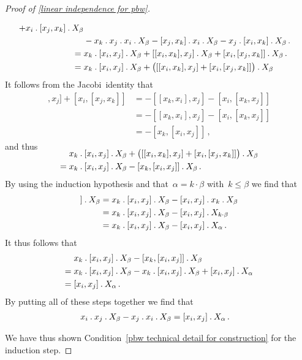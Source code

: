 \begin{proof}[Proof of \cref{linear independence for pbw}]
\begin{description}
\begin{align*}
        + x_i \mathbin{.} [x_j, x_k] \mathbin{.} X_\beta
        \\
        {}&
        - x_k \mathbin{.} x_j \mathbin{.} x_i \mathbin{.} X_\beta
        - [x_j, x_k] \mathbin{.} x_i \mathbin{.} X_\beta
        - x_j \mathbin{.} [x_i, x_k] \mathbin{.} X_\beta \,.
        \\
        ={}&
        x_k \mathbin{.} [x_i, x_j] \mathbin{.} X_\beta
        + [[x_i, x_k], x_j] \mathbin{.} X_\beta
        + [x_i, [x_j, x_k]] \mathbin{.} X_\beta \,.
        \\
        ={}&
        x_k \mathbin{.} [x_i, x_j] \mathbin{.} X_\beta
        + \bigl( [[x_i, x_k], x_j] + [x_i, [x_j, x_k]] \bigr) \mathbin{.} X_\beta
      \end{align*}
      It follows from the Jacobi~identity that
      \begin{align*}
        [[x_i, x_k], x_j] + [x_i, [x_j, x_k]]
        &=
        - [[x_k, x_i], x_j] - [x_i, [x_k, x_j]]
        \\
        &=
        - [[x_k, x_i], x_j] - [x_i, [x_k, x_j]]
        \\
        &=
        - [x_k, [x_i, x_j]] \,,
      \end{align*}
      and thus
      \begin{align*}
        \SwapAboveDisplaySkip
        {}&
        x_k \act [x_i, x_j] \act X_\beta
        + \bigl( [[x_i, x_k], x_j] + [x_i, [x_j, x_k]] \bigr) \act X_\beta
        \\
        ={}&
        x_k \act [x_i, x_j] \act X_\beta
        - [x_k, [x_i, x_j] ] \act X_\beta \,.
      \end{align*}
      By using the induction hypothesis and that~$\alpha = k \cdot \beta$ with~$k \leq \beta$ we find that
      \begin{align*}
        [x_k, [x_i, x_j]] \act X_\beta
        &=
        x_k \act [x_i, x_j] \act X_\beta
        - [x_i, x_j] \act x_k \act X_\beta
        \\
        &=
        x_k \act [x_i, x_j] \act X_\beta
        - [x_i, x_j] \act X_{k \cdot \beta}
        \\
        &=
        x_k \act [x_i, x_j] \act X_\beta
        - [x_i, x_j] \act X_{\alpha} \,.
      \end{align*}
      It thus follows that
      \begin{align*}
        {}&
        x_k \mathbin{.} [x_i, x_j] \mathbin{.} X_\beta
        - [x_k, [x_i, x_j] ] \mathbin{.} X_\beta
        \\
        ={}&
        x_k \mathbin{.} [x_i, x_j] \mathbin{.} X_\beta
        - x_k \mathbin{.} [x_i, x_j] \mathbin{.} X_\beta
        + [x_i, x_j] \mathbin{.} X_{\alpha}
        \\
        ={}&
        [x_i, x_j] \mathbin{.} X_{\alpha} \,.
      \end{align*}
      By putting all of these steps together we find that
      \begin{align*}
        x_i \mathbin{.} x_j \mathbin{.} X_\beta
        - x_j \mathbin{.} x_i \mathbin{.} X_\beta
        &=
        [x_i, x_j] \mathbin{.} X_{\alpha} \,.
      \end{align*}
  \end{description}
  We have thus shown Condition~\ref{pbw technical detail for construction} for the induction step.


\end{proof}
